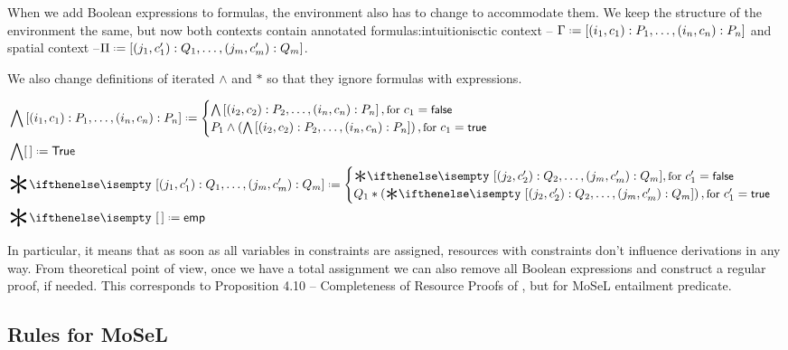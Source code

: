 When we add Boolean expressions to formulas, the environment also has to change to accommodate them.
We keep the structure of the environment the same, but now both contexts contain annotated formulas:intuitionisctic context --
\(\IntuD \defeq \left[(i_1, c_1) : P_1, \ldots , (i_n,c_n) : P_n \right]\) and spatial context --\(\SpatD \defeq [(j_1, c'_1) :Q_1 , \ldots, (j_m, c'_m) :Q_m]\).

We also change definitions of iterated \(\wedge\) and \(*\) so that they ignore formulas with \false expressions.

\begin{minipage}[t]{1\linewidth}
  \begin{align*}
    & \bigwedge  \left[(i_1, c_1) : P_1, \ldots , (i_n,c_n) : P_n \right] \defeq
      \begin{cases}
        \bigwedge \left[(i_2, c_2) : P_2, \ldots , (i_n,c_n) : P_n \right],
          {\small \text{for } c_1 = \false}\\
        P_1 \wedge \left( \bigwedge \left[(i_2, c_2) : P_2, \ldots , (i_n,c_n) : P_n \right] \right),
          {\small \text{for } c_1 = \true }
      \end{cases}\\
    & \bigwedge [\,] \defeq \True \\
    & \Sep {\left[(j_1, c'_1) :Q_1 , \ldots, (j_m, c'_m) :Q_m \right]} \defeq
      \begin{cases}
        \Sep {\left[(j_2, c'_2) :Q_2 , \ldots, (j_m, c'_m) :Q_m \right]},
          {\small \text{for } c'_1 = \false} \\
        Q_1 * \left(\Sep {\left[(j_2, c'_2) :Q_2 , \ldots, (j_m, c'_m) :Q_m \right]} \right),
          {\small \text{for } c'_1 = \true}
      \end{cases}\\
    & \Sep {[\,]} \defeq \emp
  \end{align*}
\end{minipage}

In particular, it means that as soon as all variables in constraints are assigned, resources with \false constraints don't influence derivations in any way.
From theoretical point of view, once we have a total assignment we can also remove all Boolean expressions and construct a regular proof, if needed.
This corresponds to Proposition 4.10 -- Completeness of Resource Proofs of \citet[page~25]{harlandResourceDistributionBooleanConstraints2003}, but for MoSeL entailment predicate.

\subsection{Rules for MoSeL}

